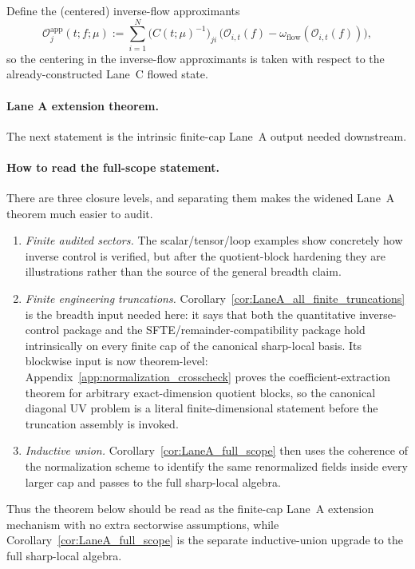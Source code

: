 Define the (centered) inverse-flow approximants
\begin{equation}\label{eq:inverse_flow_approx}
\mathcal O^{\mathrm{app}}_{j}(t;f;\mu)
:=\sum_{i=1}^{N}\big(C(t;\mu)^{-1}\big)_{ji}\,\big(\mathcal O_{i,t}(f)-\omega_{\mathrm{flow}}(\mathcal O_{i,t}(f))\big),
\end{equation}
so the centering in the inverse-flow approximants is taken with respect to the already-constructed Lane~C flowed state.

\paragraph{Lane A extension theorem.}
The next statement is the intrinsic finite-cap Lane~A output needed downstream.

\paragraph{How to read the full-scope statement.}
There are three closure levels, and separating them makes the widened Lane~A theorem much easier to audit.
\begin{enumerate}[label=(\roman*),leftmargin=2.3em]
\item \emph{Finite audited sectors.} The scalar/tensor/loop examples show concretely how inverse control is verified, but after the quotient-block hardening they are illustrations rather than the source of the general breadth claim.
\item \emph{Finite engineering truncations.} Corollary~\ref{cor:LaneA_all_finite_truncations} is the breadth input needed here:
it says that both the quantitative inverse-control package and the SFTE/remainder-compatibility package hold intrinsically on every finite cap of the canonical sharp-local basis.
Its blockwise input is now theorem-level: Appendix~\ref{app:normalization_crosscheck} proves the coefficient-extraction theorem for arbitrary exact-dimension quotient blocks,
so the canonical diagonal UV problem is a literal finite-dimensional statement before the truncation assembly is invoked.
\item \emph{Inductive union.} Corollary~\ref{cor:LaneA_full_scope} then uses the coherence of the normalization scheme to identify the same renormalized fields inside every larger cap and passes to the full sharp-local algebra.
\end{enumerate}
Thus the theorem below should be read as the finite-cap Lane~A extension mechanism with no extra sectorwise assumptions,
while Corollary~\ref{cor:LaneA_full_scope} is the separate inductive-union upgrade to the full sharp-local algebra.

